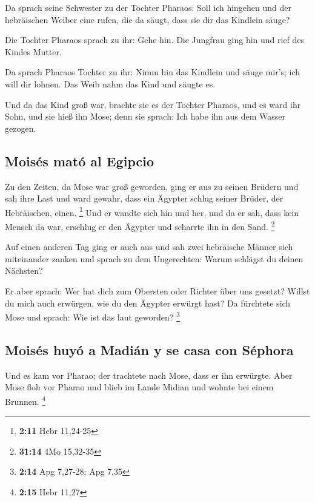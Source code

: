  Da sprach seine Schwester zu der Tochter Pharaos: Soll
ich hingehen und der hebräischen Weiber eine rufen, die da säugt, dass
sie dir das Kindlein säuge?

 Die Tochter Pharaos sprach zu ihr: Gehe hin. Die Jungfrau
ging hin und rief des Kindes Mutter.

 Da sprach Pharaos Tochter zu ihr: Nimm hin das Kindlein
und säuge mir's; ich will dir lohnen. Das Weib nahm das Kind und säugte
es.

 Und da das Kind groß war, brachte sie es der Tochter
Pharaos, und es ward ihr Sohn, und sie hieß ihn Mose; denn sie sprach:
Ich habe ihn aus dem Wasser gezogen.

\hypertarget{moisuxe9s-matuxf3-al-egipcio}{%
\subsection{Moisés mató al Egipcio}\label{moisuxe9s-matuxf3-al-egipcio}}

 Zu den Zeiten, da Mose war groß geworden, ging er aus zu
seinen Brüdern und sah ihre Last und ward gewahr, dass ein Ägypter
schlug seiner Brüder, der Hebräischen, einen. \footnote{\textbf{2:11}
  Hebr 11,24-25}  Und er wandte sich hin und her, und da
er sah, dass kein Mensch da war, erschlug er den Ägypter und scharrte
ihn in den Sand. \footnote{\textbf{31:14} 4Mo 15,32-35}

 Auf einen anderen Tag ging er auch aus und sah zwei
hebräische Männer sich miteinander zanken und sprach zu dem Ungerechten:
Warum schlägst du deinen Nächsten?

 Er aber sprach: Wer hat dich zum Obersten oder Richter
über uns gesetzt? Willst du mich auch erwürgen, wie du den Ägypter
erwürgt hast? Da fürchtete sich Mose und sprach: Wie ist das laut
geworden? \footnote{\textbf{2:14} Apg 7,27-28; Apg 7,35}

\hypertarget{moisuxe9s-huyuxf3-a-madiuxe1n-y-se-casa-con-suxe9phora}{%
\subsection{Moisés huyó a Madián y se casa con
Séphora}\label{moisuxe9s-huyuxf3-a-madiuxe1n-y-se-casa-con-suxe9phora}}

 Und es kam vor Pharao; der trachtete nach Mose, dass er
ihn erwürgte. Aber Mose floh vor Pharao und blieb im Lande Midian und
wohnte bei einem Brunnen. \footnote{\textbf{2:15} Hebr 11,27}

